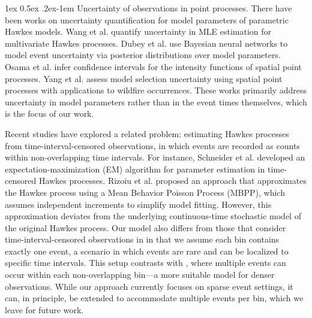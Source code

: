\documentclass[11pt]{article}
\makeatletter
\theoremstyle{remark}
\theoremstyle{plain}
\renewcommand{\paragraph}{%
  \@startsection{paragraph}{4}%
  {\z@}{1ex \@plus 0.5ex \@minus .2ex}{-1em}%
  {\normalfont\normalsize\itshape}%
}
\makeatother
\begin{document}
\paragraph{Uncertainty of observations in point processes.} There have been works on uncertainty quantification for model parameters of parametric Hawkes models. Wang et al. \cite{wang2020uncertainty} quantify uncertainty in MLE estimation for multivariate Hawkes processes. Dubey et al. \cite{dubey2021bayesian} use Bayesian neural networks to model event uncertainty via posterior distributions over model parameters. Osama et al. \cite{osama2019prediction} infer confidence intervals for the intensity functions of spatial point processes. Yang et al. \cite{yang2015predicting} assess model selection uncertainty using spatial point processes with applications to wildfire occurrences. These works primarily address uncertainty in model parameters rather than in the event times themselves, which is the focus of our work.

Recent studies have explored a related problem: estimating Hawkes processes from time-interval-censored observations, in which events are recorded as counts within non-overlapping time intervals. For instance, Schneider et al. \cite{schneider2023estimation} developed an expectation-maximization (EM) algorithm for parameter estimation in time-censored Hawkes processes. Rizoiu et al. \cite{rizoiu2022interval} proposed an approach that approximates the Hawkes process using a Mean Behavior Poisson Process (MBPP), which assumes independent increments to simplify model fitting. However, this approximation deviates from the underlying continuous-time stochastic model of the original Hawkes process. Our model also differs from those that consider time-interval-censored observations in \cite{schneider2023estimation, rizoiu2022interval} in that we assume each bin contains exactly one event, a scenario in which events are rare and can be localized to specific time intervals. This setup contrasts with \cite{schneider2023estimation, rizoiu2022interval}, where multiple events can occur within each non-overlapping bin—a more suitable model for denser observations. While our approach currently focuses on sparse event settings, it can, in principle, be extended to accommodate multiple events per bin, which we leave for future work.
\end{document}
